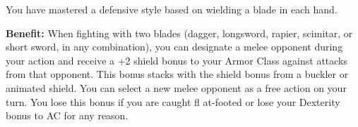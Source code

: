 
You have mastered a defensive style based on wielding a blade in each hand.

\textbf{Benefit:} When fighting with two blades (dagger, longsword, rapier, scimitar, or short sword, in any combination), you can designate a melee opponent during your action and receive a +2 shield bonus to your Armor Class against attacks from that opponent. This bonus stacks with the shield bonus from a buckler or animated shield. You can select a new melee opponent as a free action on your turn. You lose this bonus if you are caught fl at-footed or lose your Dexterity bonus to AC for any reason.